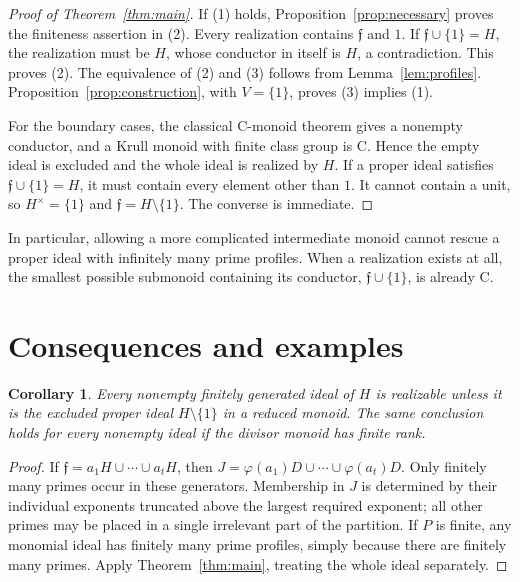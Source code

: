 \documentclass[11pt]{article}
\newtheorem{corollary}[theorem]{Corollary}
\theoremstyle{definition}
\newcommand{\ff}{\mathfrak f}
\begin{document}
\begin{proof}[Proof of Theorem~\ref{thm:main}]
If (1) holds, Proposition~\ref{prop:necessary} proves the finiteness assertion in (2). Every realization contains $\ff$ and $1$. If $\ff\cup\{1\}=H$, the realization must be $H$, whose conductor in itself is $H$, a contradiction. This proves (2). The equivalence of (2) and (3) follows from Lemma~\ref{lem:profiles}. Proposition~\ref{prop:construction}, with $V=\{1\}$, proves (3) implies (1).

For the boundary cases, the classical C-monoid theorem gives a nonempty conductor, and a Krull monoid with finite class group is C. Hence the empty ideal is excluded and the whole ideal is realized by $H$. If a proper ideal satisfies $\ff\cup\{1\}=H$, it must contain every element other than $1$. It cannot contain a unit, so $H^\times=\{1\}$ and $\ff=H\setminus\{1\}$. The converse is immediate.
\end{proof}

In particular, allowing a more complicated intermediate monoid cannot rescue a proper ideal with infinitely many prime profiles. When a realization exists at all, the smallest possible submonoid containing its conductor, $\ff\cup\{1\}$, is already C.

\section{Consequences and examples}

\begin{corollary}\label{cor:finite}
Every nonempty finitely generated ideal of $H$ is realizable unless it is the excluded proper ideal $H\setminus\{1\}$ in a reduced monoid. The same conclusion holds for every nonempty ideal if the divisor monoid has finite rank.
\end{corollary}
\begin{proof}
If $\ff=a_1H\cup\cdots\cup a_tH$, then $J=\varphi(a_1)D\cup\cdots\cup\varphi(a_t)D$. Only finitely many primes occur in these generators. Membership in $J$ is determined by their individual exponents truncated above the largest required exponent; all other primes may be placed in a single irrelevant part of the partition. If $P$ is finite, any monomial ideal has finitely many prime profiles, simply because there are finitely many primes. Apply Theorem~\ref{thm:main}, treating the whole ideal separately.
\end{proof}
\end{document}
